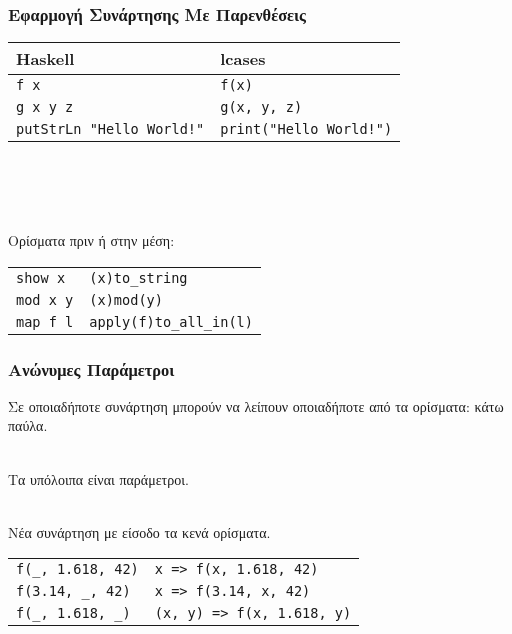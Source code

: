 \documentclass{beamer}
\begin{document}
\begin{frame}[fragile]

\frametitle{Εφαρμογή Συνάρτησης Με Παρενθέσεις}

\begin{otherlanguage}{english}

\begin{center}
\begin{tabular}{ |P{5cm}|P{5cm}| }
 \hline
 Haskell & lcases
 \\
 \hline
 \verb|f x| & \verb|f(x)|
 \\
 \verb|g x y z| & \verb|g(x, y, z)|
 \\
 \verb|putStrLn "Hello World!"| & \verb|print("Hello World!")|
 \\
 \hline
\end{tabular}
\\~\
\\~\
\end{center}

\end{otherlanguage}

Ορίσματα πριν ή στην μέση:
\begin{otherlanguage}{english}
\begin{center}
\begin{tabular}{ |P{5cm}|P{5cm}| }
 \hline
 \verb|show x| & \verb|(x)to_string|
 \\
 \verb|mod x y| & \verb|(x)mod(y)|
 \\
 \verb|map f l| & \verb|apply(f)to_all_in(l)|
 \\
 \hline
\end{tabular}
\end{center}
\end{otherlanguage}

\end{frame}

\begin{frame}[fragile]

\frametitle{Ανώνυμες Παράμετροι}

Σε οποιαδήποτε συνάρτηση μπορούν να λείπουν οποιαδήποτε από τα ορίσματα:
κάτω παύλα.
\\~\

Τα υπόλοιπα είναι παράμετροι.
\\~\

Νέα συνάρτηση με είσοδο τα κενά ορίσματα.
\begin{otherlanguage}{english}
\begin{center}
\begin{tabular}{ |P{5cm}|P{5cm}| }
 \hline
 \verb|f(_, 1.618, 42)| & \verb|x => f(x, 1.618, 42)|
 \\
 \verb|f(3.14, _, 42)| & \verb|x => f(3.14, x, 42)|
 \\
 \verb|f(_, 1.618, _)| & \verb|(x, y) => f(x, 1.618, y)|
 \\
 \hline
\end{tabular}
\end{center}
\end{otherlanguage}

\end{frame}
\end{document}
